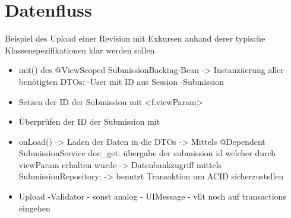 \documentclass{beamer}
\begin{document}
    \section{Datenfluss}
    Beispiel des Upload einer Revision
    mit Exkursen anhand derer typische Klassenspezifikationen klar werden sollen.
    \begin{frame}
        \begin{itemize}
            \item init() des @ViewScoped SubmissionBacking-Bean
            -> Instanziierung aller benötigten DTOs:
            -User mit ID aus Session %
            -Submission
            \item Setzen der ID der Submission mit <f:viewParam>
            \item Überprüfen der ID der Submission mit %
            \item onLoad()
            -> Laden der Daten in die DTOs
            -> Mittels @Dependent SubmissionService doc_get: übergabe der submission id
            welcher durch viewParam erhalten wurde
            -> Datenbankzugriff mittels SubmissionRepository:
            -> benutzt Transaktion um ACID sicherzustellen
            \item Upload
            -Validator
            - sonst analog
            - UIMessage
            - vllt noch auf transactions eingehen
        \end{itemize}
    \end{frame}
\end{document}
